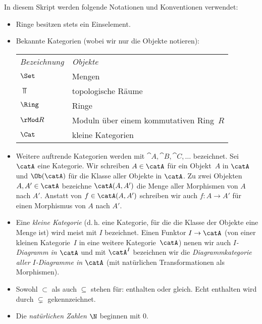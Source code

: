 \bigskip
In diesem Skript werden folgende Notationen und Konventionen verwendet:
\begin{itemize}
    \item
        Ringe besitzen stets ein Einselement.
        
    \item
        Bekannte Kategorien (wobei wir nur die Objekte notieren):
        
        \hspace{6mm}
        \begin{tabular}{l@{\qquad}l}
            \emph{Bezeichnung} & \emph{Objekte}                         \\[2pt]
            $\Set$      &   Mengen                                      \\
            $\Top$      &   topologische Räume                          \\
            $\Ring$     &   Ringe                                       \\
            $\rMod R$   &   Moduln über einem kommutativen Ring~$R$     \\
            $\Cat$      &   kleine Kategorien
        \end{tabular}
        
    \item
        Weitere auftrende Kategorien werden mit $\cat A,\cat B, \cat C, \dots$
        bezeichnet. Sei $\catA$ eine Kategorie. Wir schreiben $A\in\catA$
        für ein Objekt~$A$ in $\catA$ und $\Ob(\catA)$ für die Klasse aller
        Objekte in $\catA$. Zu zwei Objekten $A,A'\in\catA$ bezeichne
        $\catA(A,A')$ die Menge aller Morphismen von $A$ nach $A'$.
        Anstatt von $f\in\catA(A,A')$ schreiben wir auch $f\colon A\to A'$ für
        einen Morphismus von $A$ nach $A'$.
        
    \item
        Eine \emph{kleine Kategorie} (d.\,h. eine Kategorie, für die die Klasse
        der Objekte eine Menge ist) wird meist mit $I$ bezeichnet. Einen Funktor
        $I\to\catA$ (von einer kleinen Kategorie~$I$ in eine weitere
        Kategorie~$\catA$) nenen wir auch \emph{$I$-Diagramm in $\catA$} und
        mit $\catA^I$ bezeichnen wir die \emph{Diagrammkategorie aller
        $I$-Diagramme in $\catA$} (mit natürlichen Transformationen als
        Morphismen).
        
    \item
        Sowohl $\subset$ als auch $\subseteq$ stehen für: enthalten oder gleich.
        Echt enthalten wird durch $\subsetneq$ gekennzeichnet.
        
    \item
        Die \emph{natürlichen Zahlen $\N$} beginnen mit $0$.
\end{itemize}
